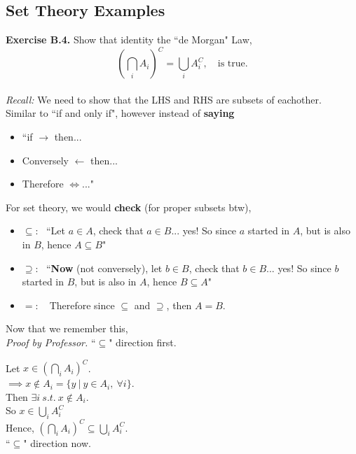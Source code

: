 \documentclass[12pt]{book}
\begin{document}
\subsection{Set Theory Examples}
\textbf{Exercise B.4. } Show that identity the ``de Morgan" Law, $$\left( \bigcap\limits_i A_i\right)^{C}=\bigcup\limits_i A_i^{C},~~~\text{ is true.}$$\\

\noindent\textit{Recall: } We need to show that the LHS and RHS are subsets of eachother.\\ 
Similar to ``if and only if", however instead of \textbf{saying} 
\begin{itemize}
\item ``if $\rightarrow$ then... 
\item Conversely $\leftarrow$ then... 
\item Therefore $\iff{}$..." 
\end{itemize}

\noindent For set theory, we would \textbf{check} (for proper subsets btw), 
\begin{itemize}
\item $\subseteq :~~~$``Let $a \in A$, check that $a \in B$... yes! So since $a$ started in $A$, but is also in $B$, hence $A\subseteq B$"
\item $\supseteq :~~~$``\textbf{Now} (not conversely), let $b \in B$, check that $b \in B$... yes! So since $b$ started in $B$, but is also in $A$, hence $B\subseteq A$"
\item $=: ~~~$ Therefore since $\subseteq$ and $\supseteq$, then $A=B$.
\end{itemize}
Now that we remember this,\\

\noindent \textit{Proof by Professor. } ``$\subseteq$" direction first.

\noindent Let $x \in \left( \bigcap\limits_i A_i\right)^{C}$. \\

$\implies x \notin A_i=\{y~|~ y\in A_i,~\forall i\}$.\\

\noindent Then $\exists i~s.t.~ x\notin A_i$.\\
So $x \in \bigcup\limits_i A_i^{C}$\\
Hence, $\left( \bigcap\limits_i A_i\right)^{C}   \subseteq  \bigcup\limits_i A_i^{C}.$\\

\noindent``$\subseteq$" direction now.\\
\end{document}
